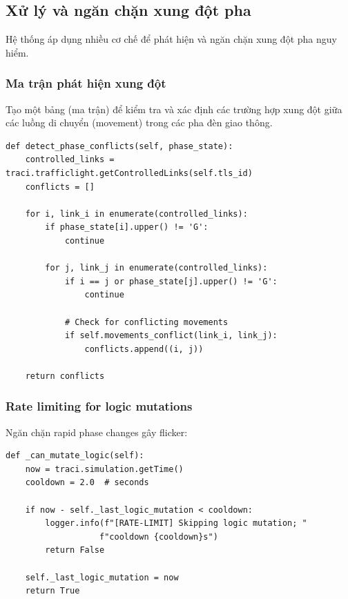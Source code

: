 \subsection{Xử lý và ngăn chặn xung đột pha}

Hệ thống áp dụng nhiều cơ chế để phát hiện và ngăn chặn xung đột pha nguy hiểm.

\subsubsection{Ma trận phát hiện xung đột}

Tạo một bảng (ma trận) để kiểm tra và xác định các trường hợp xung đột giữa các luồng di chuyển (movement) trong các pha đèn giao thông.
\begin{lstlisting}[style=py, caption={Phase conflict detection}]
def detect_phase_conflicts(self, phase_state):
    controlled_links = traci.trafficlight.getControlledLinks(self.tls_id)
    conflicts = []
    
    for i, link_i in enumerate(controlled_links):
        if phase_state[i].upper() != 'G':
            continue
            
        for j, link_j in enumerate(controlled_links):
            if i == j or phase_state[j].upper() != 'G':
                continue
                
            # Check for conflicting movements
            if self.movements_conflict(link_i, link_j):
                conflicts.append((i, j))
                
    return conflicts
\end{lstlisting}

\subsubsection{Rate limiting for logic mutations}

Ngăn chặn rapid phase changes gây flicker:

\begin{lstlisting}[style=py, caption={Logic mutation rate limiting}]
def _can_mutate_logic(self):
    now = traci.simulation.getTime()
    cooldown = 2.0  # seconds
    
    if now - self._last_logic_mutation < cooldown:
        logger.info(f"[RATE-LIMIT] Skipping logic mutation; "
                   f"cooldown {cooldown}s")
        return False
        
    self._last_logic_mutation = now
    return True
\end{lstlisting}

